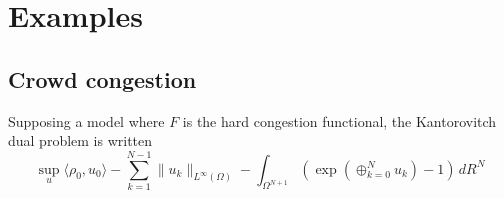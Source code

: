 \documentclass{article}
\begin{document}
    
    
    \section{Examples}
    
    \subsection{Crowd congestion}
    
    Supposing a model where $F$ is the hard congestion functional, the Kantorovitch dual problem is written
    \begin{equation}
    \sup_u{} \langle\rho_0, u_0\rangle
    - \sum_{k=1}^{N-1} \|u_k\|_{L^\infty(\Omega)} - \int_{\Omega^{N+1}} \left(
    	\exp\left(\oplus_{k=0}^Nu_k\right) - 1
    \right) \,dR^N
    \end{equation}
    
    
    
    \printbibliography{}
    
    
    
    
    
    
    
\end{document}
